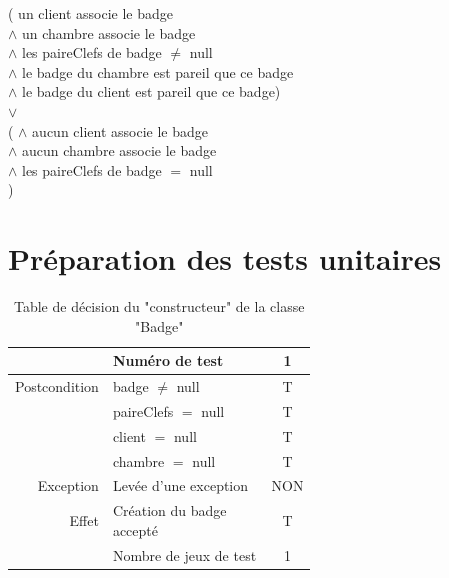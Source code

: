 \documentclass[11pt,article]{article}
\newcommand{\nullvalue}{\textsf{null}\xspace}
\begin{document}
					( un client associe le badge \\
									\hspace{1cm} $\land$ un chambre associe le badge\\
									\hfill $\land$ les paireClefs de badge $\neq$ null\\
									$\land$ le badge du chambre est pareil que ce badge\\
									$\land$ le badge du client est pareil que ce badge)\\
							$\lor$ \\ (
									$\land$ aucun client associe le badge\\
									$\land$ aucun chambre associe le badge\\
									$\land$ les paireClefs de badge $=$ null\\
							)

\newpage

\section{Préparation des tests unitaires}


    \begin{table}[htbp!]
        \begin{tabular}{r|p{0.6\linewidth}|c|}
            \cline{2-3}

                &Numéro de test
                &1\\
            \hline
            \hline

            Postcondition
                &badge $\neq$ \nullvalue
                &T\\
            \cline{2-3}
                &paireClefs $=$ \nullvalue
                &T\\
            \cline{2-3}
                &client $=$ \nullvalue
                &T\\
            \cline{2-3}
                &chambre $=$ \nullvalue
                &T\\
            \cline{2-3}
            Exception
                &Levée d'une exception
                &NON\\
            \hline
            \hline
            Effet
                &Création du badge accepté
                &T\\
            \hline
            \hline
                &Nombre de jeux de test
                &1\\
            \cline{2-3}
        \end{tabular}
        \caption{Table de décision du "constructeur" de la classe "Badge"}
    \end{table}
\end{document}
